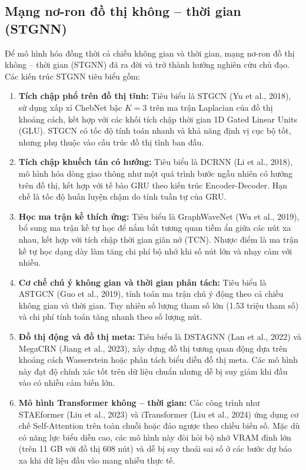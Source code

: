 \subsection{Mạng nơ-ron đồ thị không -- thời gian (STGNN)}
Để mô hình hóa đồng thời cả chiều không gian và thời gian, mạng nơ-ron đồ thị không -- thời gian (STGNN) đã ra đời và trở thành hướng nghiên cứu chủ đạo. Các kiến trúc STGNN tiêu biểu gồm:
\begin{enumerate}
    \item \textbf{Tích chập phổ trên đồ thị tĩnh:} Tiêu biểu là STGCN (Yu et al., 2018), sử dụng xấp xỉ ChebNet bậc $K=3$ trên ma trận Laplacian của đồ thị khoảng cách, kết hợp với các khối tích chập thời gian 1D Gated Linear Units (GLU). STGCN có tốc độ tính toán nhanh và khả năng định vị cục bộ tốt, nhưng phụ thuộc vào cấu trúc đồ thị tĩnh ban đầu.
    \item \textbf{Tích chập khuếch tán có hướng:} Tiêu biểu là DCRNN (Li et al., 2018), mô hình hóa dòng giao thông như một quá trình bước ngẫu nhiên có hướng trên đồ thị, kết hợp với tế bào GRU theo kiến trúc Encoder-Decoder. Hạn chế là tốc độ huấn luyện chậm do tính tuần tự của GRU.
    \item \textbf{Học ma trận kề thích ứng:} Tiêu biểu là GraphWaveNet (Wu et al., 2019), bổ sung ma trận kề tự học để nắm bắt tương quan tiềm ẩn giữa các nút xa nhau, kết hợp với tích chập thời gian giãn nở (TCN). Nhược điểm là ma trận kề tự học dạng dày làm tăng chi phí bộ nhớ khi số nút lớn và nhạy cảm với nhiễu.
    \item \textbf{Cơ chế chú ý không gian và thời gian phân tách:} Tiêu biểu là ASTGCN (Guo et al., 2019), tính toán ma trận chú ý động theo cả chiều không gian và thời gian. Tuy nhiên số lượng tham số lớn (1.53 triệu tham số) và chi phí tính toán tăng nhanh theo số lượng nút.
    \item \textbf{Đồ thị động và đồ thị meta:} Tiêu biểu là DSTAGNN (Lan et al., 2022) và MegaCRN (Jiang et al., 2023), xây dựng đồ thị tương quan động dựa trên khoảng cách Wasserstein hoặc phân tách biểu diễn đồ thị meta. Các mô hình này đạt độ chính xác tốt trên dữ liệu chuẩn nhưng dễ bị suy giảm khi đầu vào có nhiễu cảm biến lớn.
    \item \textbf{Mô hình Transformer không -- thời gian:} Các công trình như STAEformer (Liu et al., 2023) và iTransformer (Liu et al., 2024) ứng dụng cơ chế Self-Attention trên toàn chuỗi hoặc đảo ngược theo chiều biến số. Mặc dù có năng lực biểu diễn cao, các mô hình này đòi hỏi bộ nhớ VRAM đỉnh lớn (trên 11 GB với đồ thị 608 nút) và dễ bị suy thoái sai số ở các bước dự báo xa khi dữ liệu đầu vào mang nhiễu thực tế.
\end{enumerate}

